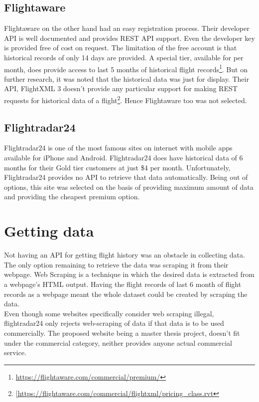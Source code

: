 \subsection{Flightaware}
Flightaware on the other hand had an easy registration process. Their developer API is well documented and provides REST API support. Even the developer key is provided free of cost on request. The limitation of the free account is that historical records of only 14 days are provided. A special tier, available for  per month, does provide access to last 5 months of historical flight records\footnote{\url{https://flightaware.com/commercial/premium/}}. But on further research, it was noted that  the historical data was just for display. Their API, FlightXML 3 doesn't provide any particular support for making REST requests for historical data of a flight\footnote{\url{[https://flightaware.com/commercial/flightxml/pricing_class.rvt}}. Hence Flightaware too was not selected.

\subsection{Flightradar24}
Flightradar24 is one of the most famous sites on internet with mobile apps available for iPhone and Android. Flightradar24 does have historical data of 6 months for their Gold tier customers at just \$4 per month. Unfortunately, Flightradar24 provides no API to retrieve that data automatically. Being out of options, this site was selected on the basis of providing maximum amount of data and providing the cheapest premium option.

\section{Getting data}
Not having an API for getting flight history was an obstacle in collecting data. The only option remaining to retrieve the data was scraping it from their webpage. Web Scraping is a technique in which the desired data is extracted from a webpage's HTML output. Having the flight records of last 6 month of flight records as a webpage meant the whole dataset could be created by scraping the data.
\\Even though some websites specifically consider web scraping illegal\cite{Hirschey2014SymbioticScraping}, flightradar24 only rejects web-scraping of data if that data is to be used commercially. The proposed website being a master thesis project, doesn't fit under the commercial category, neither provides anyone actual commercial service. 


